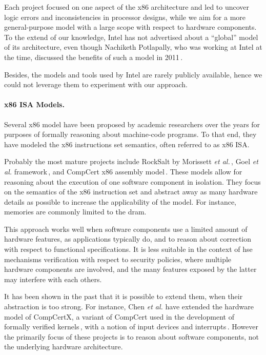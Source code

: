 Each project focused on one aspect of the x86 architecture and led to uncover
logic errors and inconsistencies in processor designs, while we aim for a more
general-purpose model with a large scope with respect to hardware components.
%
To the extend of our knowledge, Intel has not advertised about a ``global''
model of its architecture, even though Nachiketh Potlapally, who was working at
Intel at the time, discussed the benefits of such a model in
2011\,\cite{potlapally2011hardwaresecurity}.

Besides, the models and tools used by Intel are rarely publicly available, hence
we could not leverage them to experiment with our approach.
%

\paragraph{x86 ISA Models.}
%
Several x86 model have been proposed by academic researchers over the years for
purposes of formally reasoning about machine-code programs.
%
To that end, they have modeled the x86 instructions set semantics, often
referred to as x86 ISA.

Probably the most mature projects include RockSalt by Morissett \emph{et
  al.}\,\cite{morrisett2012rocksalt}, Goel \emph{et al.}
framework\,\cite{goel2014x86}, and CompCert x86 assembly
model\,\cite{leroy2012compcert}.
%
These models allow for reasoning about the execution of one software component
in isolation. They focus on the semantics of the x86 instruction set and
abstract away as many hardware details as possible to increase the applicability
of the model.
%
For instance, memories are commonly limited to the \ac{dram}.
%

This approach works well when software components use a limited amount of
hardware features, as applications typically do, and to reason about correction
with respect to functional specifications.
%
It is less suitable in the context of \ac{hse} mechanisms verification with
respect to security policies, where multiple hardware components are involved,
and the many features exposed by the latter may interfere with each others.

It has been shown in the past that it is possible to extend them, when their
abstraction is too strong.
%
For instance, Chen \emph{et al.} have extended the hardware model of CompCertX,
a variant of CompCert used in the development of formally verified
kernels\,\cite{gu2016certikos}, with a notion of input devices and
interrupts\,\cite{chen2018interrupt}.
%
However the primarily focus of these projects is to reason about software
components, not the underlying hardware architecture.

